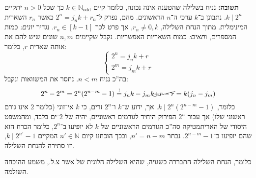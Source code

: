\documentclass[]{article}
\newcommand\N     {\mathbb{N}}
\newcommand\Nodd  {\N_{\mathrm{odd }}}
\newcommand\seq   {\overset{!}{=}}
\begin{document}
	\textbf{תשובה: }נניח בשלילה שהטענה אינה נכונה, כלומר קיים $k \in \Nodd$ כך שכל $n > 0$ יתקיים $k \mid 2^n$. נתבונן ב־$k$ ערכי ה־$n$ הראשונים. מהם, נפרק ל־$2^n = j_nk + r_n$ כאשר $r_n$ השארית המינימלית. מתוך הנחת השלילה, $r_n \neq 0, k$, אך פרט לכך $r_n \in [k - 1]$. נגדיר \textit{יונים: }כמות המספרים, ו\textit{תאים: }כמות השאריות האפשריות. נקבל שקיימים $n, m$ שונים שיש להם את אותה שארית $r$, כלומר: 
	\[ \begin{cases}
		2^n = j_n k + r \\
		2^m = j_m k + r
	\end{cases} \]
	בה''כ נניח $n < m$. נחסר את המשוואות ונקבל: 
	\[ 2^n - 2^m = 2^n(2^{n - m} - 1) \seq j_n k - j_m k \cancel{ + r - r} = k(j_n - j_m) \]
	כלומר, $k \mid 2^n(2^{n - m} - 1)$. אך, ידוע ש־$k$ ו־$2^n$ זרים, כי $k$ אי־זוגי (כלומר $2$ אינו גורם ראשוני שלו) אך עבור $2^n$ הפירוק היחיד לגורמים ראשוניים, יהיה של $2$־ים בלבד, ומהמשפט היסודי של האריתמטיקה סה''כ הגורמים הראשוניים של $k$ לא יופיעו ב־$2^n$, כלומר הכרח הוא שהם יופיעו ב־$2^{n - m}  - 1$. נבחר $n' = n - m$, ובכך הוכחנו קיום $n' \in \N$ המקיים $k \mid 2^{n'} - 1$, וזו סתירה להנחת השלילה. 
	
	כלומר, הנחת השלילה התבררה כשגויה, שהיא השלילה הלוגית של אשר צ.ל., משמע ההוכחה השולמה. 
\end{document}
